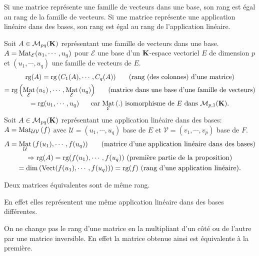 \begin{propn}
Si une matrice représente une famille de vecteurs dans une base, son rang est égal au rang de la famille de vecteurs.\newline
Si une matrice représente une application linéaire dans des bases, son rang est égal au rang de l'application linéaire. 
\end{propn}
\begin{demo}
Soit $A\in \mathcal{M}_{p q}(\mathbf{K})$ représentant une famille de vecteurs dans une base. $A = \mathop{\mathrm{Mat}}_{\mathcal{E}}(u_1,\cdots, u_q)$ pour $\mathcal{E}$ une base d'un $\mathbf{K}$-espace vectoriel $E$ de dimension $p$ et $(u_1, \cdots, u_q)$ une famille de vecteurs de $E$.  
\begin{multline*}
 \mathop{\mathrm{rg}}(A) = \mathop{\mathrm{rg}}\left( C_1(A), \cdots , C_q(A)\right) \hspace{0.5cm} \text{ (rang (des colonnes) d'une matrice)} \\
  = \mathop{\mathrm{rg}}\left( \mathop{\mathrm{Mat}}_{\mathcal{E}}\left( u_1\right), \cdots , \mathop{\mathrm{Mat}}_{\mathcal{E}}\left( u_q\right)\right) \hspace{0.5cm} \text{ (matrice dans une base d'une famille de vecteurs)} \\
  = \mathop{\mathrm{rg}}(u_1, \cdots, u_q) \hspace{0.5cm} \text{ car $\mathop{\mathrm{Mat}}_{\mathcal{E}}\left( .\right)$ isomorphisme de } E \text{ dans } \mathcal{M}_{p,1}(\mathbf{K}).
\end{multline*}
Soit $A\in \mathcal{M}_{p q}(\mathbf{K})$ représentant une application linéaire dans des bases: $A= \mathop{\mathrm{Mat}}_{\mathcal{U} \mathcal{V}}\left( f\right)$ avec $\mathcal{U} = (u_1, \cdots, u_q)$ base de $E$ et $\mathcal{V} = (v_1, \cdots, v_p)$ base de $F$.
\begin{multline*}
 A = \mathop{\mathrm{Mat}}_{\mathcal{U}}\left( f(u_1), \cdots, f(u_q) \right) \hspace{0.5cm} \text{ (matrice d'une application linéaire dans des bases)}\\
 \Rightarrow \mathop{\mathrm{rg}}(A) = \mathop{\mathrm{rg}}(f(u_1), \cdots, f(u_q))\text{ (première partie de la proposition)}\\
  = \dim \left( \mathop{\mathrm{Vect}}(f(u_1), \cdots, f(u_q))\right) = \mathop{\mathrm{rg}}(f) \text{ (rang d'une application linéaire)}.
\end{multline*}
\end{demo}

\begin{propn}
  Deux matrices équivalentes sont de même rang.
\end{propn}
\begin{demo}
  En effet elles représentent une même application linéaire dans des bases différentes.
\end{demo}
\begin{rem}
  On ne change pas le rang d'une matrice en la multipliant d'un côté ou de l'autre par une matrice inversible. En effet la matrice obtenue ainsi est équivalente à la première.
\end{rem}

